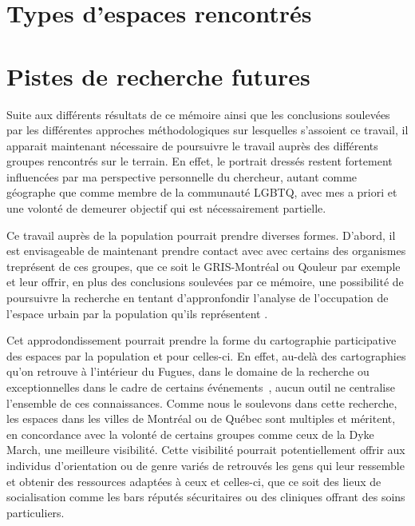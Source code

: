 \section{Types d'espaces rencontrés}
\label{sec:types_d_espaces_rencontr_s}


\section{Pistes de recherche futures}
\label{sec:pistes_de_recherches}

Suite aux différents résultats de ce mémoire ainsi que les conclusions soulevées par les différentes approches méthodologiques sur lesquelles s'assoient ce travail, il apparait maintenant nécessaire de poursuivre le travail auprès des différents groupes rencontrés sur le terrain.
En effet, le portrait dressés restent fortement influencées par ma perspective personnelle du chercheur, autant comme géographe que comme membre de la communauté LGBTQ, avec mes a priori et une volonté de demeurer objectif qui est nécessairement partielle.

Ce travail auprès de la population pourrait prendre diverses formes. 
D'abord, il est envisageable de maintenant prendre contact avec avec certains des organismes treprésent de ces groupes, que ce soit le GRIS-Montréal ou Qouleur par exemple et leur offrir, en plus des conclusions soulevées par ce mémoire, une possibilité de poursuivre la recherche en tentant d'appronfondir l'analyse de l'occupation de l'espace urbain par la population qu'ils représentent .

Cet approdondissement pourrait prendre la forme du cartographie participative des espaces \lgbt{} par la population et pour celles-ci.
En effet, au-delà des cartographies qu'on retrouve à l'intérieur du Fugues, dans le domaine de la recherche  ou exceptionnelles dans le cadre de certains événements~\parencite{Pervers/Cite2015}, aucun outil ne centralise l'ensemble de ces connaissances. 
Comme nous le soulevons dans cette recherche, les espaces \lgbt{} dans les villes de Montréal ou de Québec sont multiples et méritent, en concordance avec la volonté de certains groupes comme ceux de la Dyke March, une meilleure visibilité.
Cette visibilité pourrait potentiellement offrir aux individus d'orientation ou de genre variés de retrouvés les gens qui leur ressemble et obtenir des ressources adaptées à ceux et celles-ci, que ce soit des lieux de socialisation comme les bars réputés sécuritaires ou des cliniques offrant des soins particuliers.

